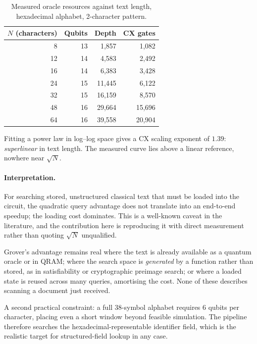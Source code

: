 \documentclass[11pt,a4paper]{article}
\begin{document}
\begin{table}[h]
\centering
\caption{Measured oracle resources against text length, hexadecimal alphabet,
2-character pattern.}
\begin{tabular}{@{}rrrr@{}}
\toprule
$N$ (characters) & Qubits & Depth & CX gates \\
\midrule
8 & 13 & 1{,}857 & 1{,}082 \\
12 & 14 & 4{,}583 & 2{,}492 \\
16 & 14 & 6{,}383 & 3{,}428 \\
24 & 15 & 11{,}445 & 6{,}122 \\
32 & 15 & 16{,}159 & 8{,}570 \\
48 & 16 & 29{,}664 & 15{,}696 \\
64 & 16 & 39{,}558 & 20{,}904 \\
\bottomrule
\end{tabular}
\end{table}

Fitting a power law in log--log space gives a CX scaling exponent of
$\mathbf{1.39}$: \emph{superlinear} in text length. The measured curve lies above
a linear reference, nowhere near $\sqrt{N}$.

\paragraph{Interpretation.} For searching stored, unstructured classical text
that must be loaded into the circuit, the quadratic query advantage does not
translate into an end-to-end speedup; the loading cost dominates. This is a
well-known caveat in the literature, and the contribution here is reproducing it
with direct measurement rather than quoting $\sqrt{N}$ unqualified.

Grover's advantage remains real where the text is already available as a quantum
oracle or in QRAM; where the search space is \emph{generated} by a function
rather than stored, as in satisfiability or cryptographic preimage search; or
where a loaded state is reused across many queries, amortising the cost. None of
these describes scanning a document just received.

A second practical constraint: a full 38-symbol alphabet requires 6 qubits per
character, placing even a short window beyond feasible simulation. The pipeline
therefore searches the hexadecimal-representable identifier field, which is the
realistic target for structured-field lookup in any case.

\end{document}
